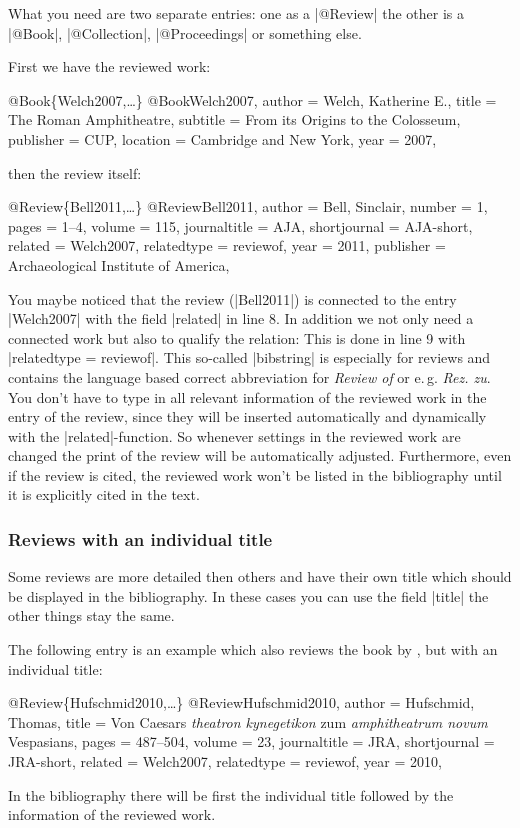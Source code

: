 \documentclass[a4paper,
10pt,
greek,
french,
spanish,
italian,
ngerman,
english,
]{ltxdoc}
\begin{document}
What you need are two separate entries: one as a |@Review| the other is a |@Book|, |@Collection|, |@Proceedings| or something else.

First we have the reviewed work:
\begin{bibexample}[label=Welch2007]{{@}Book\{Welch2007,…\}}
@Book{Welch2007,
  author    = {Welch, Katherine E.},
  title     = {The {Roman} Amphitheatre},
  subtitle  = {From its Origins to the Colosseum},
  publisher = CUP,    %
  location  = {Cambridge and New York},
  year      = {2007},
}
\end{bibexample}
then the review itself:
\begin{bibexample}[label=Bell2011]{{@}Review\{Bell2011,…\}}
@Review{Bell2011,
  author       = {Bell, Sinclair},
  number       = {1},
  pages        = {1--4},
  volume       = {115},
  journaltitle = AJA,    %
  shortjournal = AJA-short,    %
  related      = {Welch2007},
  relatedtype  = {reviewof},
  year         = {2011},
  publisher    = {Archaeological Institute of America},
}
\end{bibexample}
You maybe noticed that the review (|Bell2011|) is connected to the entry |Welch2007| with the field |related| in line 8.
In addition we not only need a connected work but also to qualify the relation:
This is done in line 9 with |relatedtype = {reviewof}|.
This so-called |bibstring| is especially for reviews and contains the language based correct abbreviation for \emph{Review of} or e.\,g. \emph{Rez. zu}.
You don’t have to type in all relevant information of the reviewed work in the entry of the review, 
since they will be inserted automatically and dynamically with the  |related|-function. 
So whenever settings in the reviewed work are changed the print of the review will be automatically adjusted. 
Furthermore, even if the review is cited, the reviewed work won't be listed in the bibliography until it is explicitly cited in the text.


\subsubsection{Reviews with an individual title}
Some reviews are more detailed then others and  have their own title which should be displayed in the bibliography.
In these cases you can use the field |title| the other things stay the same.

The following entry is an example which also reviews the book by \citeauthor*{Welch2007},  but with an individual title:
\begin{bibexample}[label=Hufschmid2010]{{@}Review\{Hufschmid2010,…\}}
@Review{Hufschmid2010,
  author       = {Hufschmid, Thomas},
  title        = {Von Caesars \emph{theatron kynegetikon} zum \emph{amphitheatrum novum} Vespasians},
  pages        = {487--504},
  volume       = {23},
  journaltitle = JRA,    %
  shortjournal = JRA-short,    %
  related      = {Welch2007},
  relatedtype  = {reviewof},
  year         = {2010},
}
\end{bibexample}
In the bibliography there will be first the individual title followed by the information of the reviewed work.
\end{document}
